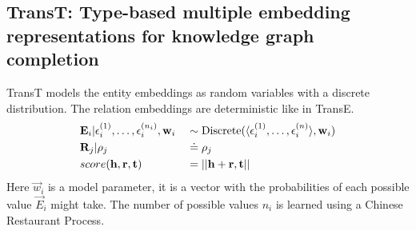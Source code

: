 \subsection{TransT: Type-based multiple embedding representations for knowledge graph completion \texorpdfstring{\citep{ma2017transt}}{}} \label{sec:transt}
%
TransT models the entity embeddings as random variables with a discrete distribution. The relation embeddings are deterministic like in TransE.
\begin{align}
    & \vec{E}_i | \epsilon_i^{(1)}, \dots, \epsilon_i^{(n_i)}, \vec{w}_i
&& \sim \text{Discrete}( \langle \epsilon_i^{(1)}, \dots, \epsilon_i^{(n)} \rangle, \vec{w}_i) \\
%
    & \vec{R}_j | \rho_j && \simpnt \rho_j \\
%
    & score(\vec{h}, \vec{r}, \vec{t}) && = || \vec{h} + \vec{r}, \vec{t} ||
\end{align}
%
Here $\vec{w}_i$ is a model parameter, it is a vector with the probabilities of each possible value $\vec{E}_i$ might take. 
The number of possible values $n_i$ is learned using a Chinese Restaurant Process.

